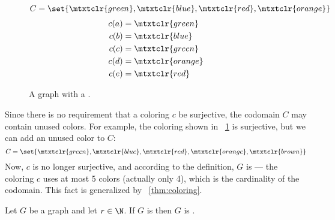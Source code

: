 \begin{figure}[H]
  \begin{minipage}{2.75in}
    \centering
  \end{minipage}
  \begin{minipage}{2.75in}
    \centering
    \(C=\set{\mtxtclr{green},\mtxtclr{blue},\mtxtclr{red},\mtxtclr{orange}}\)
    \begin{align*}
      c(a) &= \mtxtclr{green} \\
      c(b) &= \mtxtclr{blue} \\
      c(c) &= \mtxtclr{green} \\
      c(d) &= \mtxtclr{orange} \\
      c(e) &= \mtxtclr{red}
    \end{align*}
  \end{minipage}
  \caption{A graph with a .}
  \label{fig:exproper}
\end{figure}

Since there is no requirement that a coloring \(c\) be surjective, the codomain \(C\) may contain unused colors.
For example, the coloring shown in \figurename~\ref{fig:exproper} is surjective, but we can add an unused color to
\(C\):
\[C=\set{\mtxtclr{green},\mtxtclr{blue},\mtxtclr{red},\mtxtclr{orange},\mtxtclr{brown}}\]
Now, \(c\) is no longer surjective, and according to the definition, \(G\) is  --- the coloring \(c\)
uses at most 5 colors (actually only 4), which is the cardinality of the codomain.  This fact is generalized by
\theoremname~\ref{thm:coloring}.

\begin{theorem}
  \label{thm:coloring}
  Let \(G\) be a graph and let \(r\in\N\).  If \(G\) is  then \(G\) is .
\end{theorem}

